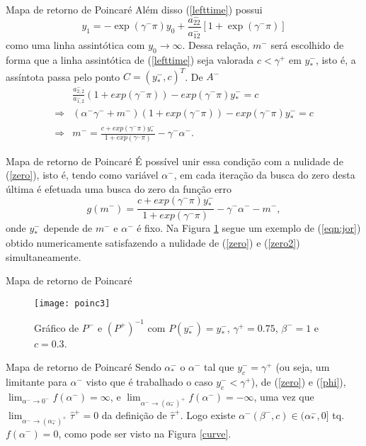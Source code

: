 \documentclass[aspectratio=169]{beamer}
\begin{document}
\begin{frame}{Mapa de retorno de Poincaré}
    Além disso (\ref{lefttime}) possui
    \begin{equation}
\label{assin}
 y_{1}=-\exp \left(\gamma^{-} \pi\right)  y_{0}+\frac{a_{22}^{-}}{a_{12}^{-}} \left[1+\exp \left(\gamma^{-} \pi\right)\right]
\end{equation}
como uma linha assintótica com  $y_{0} \to\infty$. \pause Dessa relação, $m^-$ será escolhido de forma que a linha assintótica de (\ref{lefttime}) seja valorada $c<\gamma^+$ em $y^-_*$, isto é, a assíntota passa pelo ponto $C=(y^-_*,c)^T$. De $A^-$
\begin{align*}
&\frac{a^-_{2,2}}{a^-_{1,2}}(1+exp(\gamma^-\pi))-exp(\gamma^-\pi)y_*^-=c \\
\Rightarrow&\left(\alpha^-\gamma^-+m^-\right)(1+exp(\gamma^-\pi))-exp(\gamma^-\pi)y_*^-=c \\
\Rightarrow& m^-=\frac{c+exp(\gamma^-\pi)y_*^-}{1+exp(\gamma^-\pi)}-\gamma^-\alpha^-.
\end{align*}
\end{frame}

\begin{frame}{Mapa de retorno de Poincaré}
É possível unir essa condição com a nulidade de (\ref{zero}), isto é, tendo como variável $\alpha^-$, em cada iteração da busca do zero desta última é efetuada uma busca do zero da função erro
\begin{equation}
\label{zero2}
g(m^-)=\frac{c+exp(\gamma^-\pi)y_*^-}{1+exp(\gamma^-\pi)}-\gamma^-\alpha^--m^-,
\end{equation}\pause
onde $y_*^-$ depende de $m^-$ e $\alpha^-$ é fixo. Na Figura \ref{c03} segue um exemplo de (\ref{eqn:jor}) obtido numericamente satisfazendo a nulidade de (\ref{zero}) e (\ref{zero2}) simultaneamente.
\end{frame}

\begin{frame}{Mapa de retorno de Poincaré}
    \begin{figure}[H]
\centering
\texttt{[image: poinc3]}\\
\vspace{\baselineskip}
\caption{\label{c03}Gráfico de $P^-$ e $(P^+)^{-1}$ com $P(y^-_*)=y^-_*$, $\gamma^+=0.75$, $\beta^-=1$ e $c=0.3$.}
\end{figure}
\end{frame}

\begin{frame}{Mapa de retorno de Poincaré}
    Sendo $\alpha^-_*$ o $\alpha^-$ tal que $y_c^-=\gamma^+$ (ou seja, um limitante para $\alpha^-$ visto que é trabalhado o caso $y_c^-<\gamma^+$), de (\ref{zero}) e (\ref{phi}), $\lim_{\alpha^-\to 0^-} f(\alpha^-)=\infty$, e $\lim_{\alpha^-\to (\alpha^-_*)^+} f(\alpha^-)=-\infty$, uma vez que $\lim_{\alpha^-\to (\alpha^-_*)^+}\hat{\tau}^+= 0$ da definição de $\hat{\tau}^+$. Logo existe $\alpha^-(\beta^-, c)\in(\alpha^-_*,0]$ tq. $f(\alpha^-)=0$, como pode ser visto na Figura \ref{curve}.
\end{frame}
\end{document}
